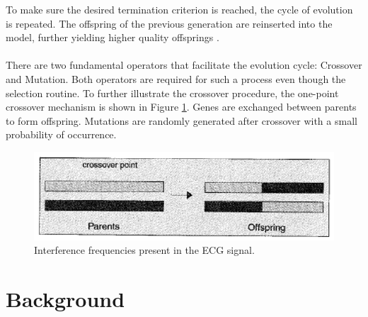 \documentclass[a4paper, 11pt]{article}
\begin{document}
    To make sure the desired termination criterion is reached, the cycle of evolution is repeated. The offspring of 
    the previous generation are reinserted into the model, further yielding higher quality offsprings \cite{Man1997}.
    \\\\
    There are two fundamental operators that facilitate the evolution cycle: Crossover and Mutation. Both operators 
    are required for such a process even though the selection routine. To further illustrate the crossover procedure, 
    the one-point crossover mechanism is shown in Figure \ref{Fig:crossover}. Genes are exchanged between parents to form 
    offspring. Mutations are randomly generated after crossover with a small probability of occurrence.
    
    \begin{figure}[h!]
        \centering
        \graphicspath{{./wiki/}}
        \includegraphics[scale=0.7]{crossover.png}
        \caption{Interference frequencies present in the ECG signal.}
        \label{Fig:crossover}
    \end{figure}

\section{Background}\label{sec:bg}
\end{document}
